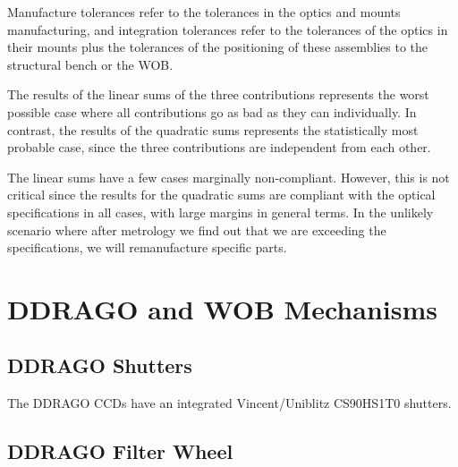 \documentclass{report}
\begin{document}
Manufacture tolerances refer to the tolerances in the optics and mounts manufacturing, and integration tolerances refer to the tolerances of the optics in their mounts plus the tolerances of the positioning of these assemblies to the structural bench or the WOB.

The results of the linear sums of the three contributions represents the worst possible case where all contributions go as bad as they can individually. In contrast, the results of the quadratic sums represents the statistically most probable case, since the three contributions are independent from each other.

The linear sums have a few cases marginally non-compliant. However, this is not critical since the results for the quadratic sums are compliant with the optical specifications in all cases, with large margins in general terms. In the unlikely scenario where after metrology we find out that we are exceeding the specifications, we will remanufacture specific parts.

\chapter{DDRAGO and WOB Mechanisms}

\section{DDRAGO Shutters}

The DDRAGO CCDs have an integrated Vincent/Uniblitz CS90HS1T0 shutters.

\section{DDRAGO Filter Wheel}
\end{document}
